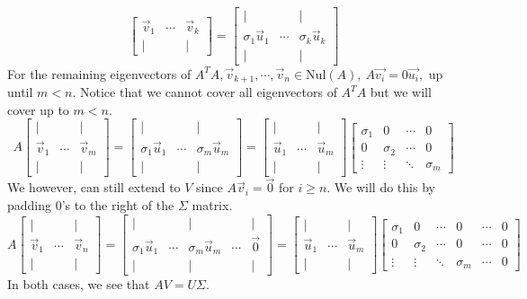 \begin{enumerate}[resume]
{$$\begin{bmatrix}
    \vec{v}_{1} & \cdots & \vec{v}_{k}  \\ | & \ & | \end{bmatrix}
    =  \begin{bmatrix} | & \ & | \\ \sigma_{1} \vec{u}_{1} & \cdots & \sigma_{k} \vec{u}_{k} \\ | & \ & | \end{bmatrix}$$
    For the remaining eigenvectors of $A^{T}A, \vec{v}_{k + 1}, \cdots, \vec{v}_{n} \in \text{Nul}(A), \ A \vec{v_{i}} = 0 \vec{u_{i}},$ up until $m < n.$ Notice that we cannot cover all eigenvectors of $A^{T} A$ but we will cover up to $m < n.$
    $$A \begin{bmatrix} | & \ & | \\
    \vec{v}_{1} & \cdots & \vec{v}_{m}  \\ | & \ & | \end{bmatrix} =
    \begin{bmatrix} | & \ & | \\ \sigma_{1} \vec{u}_{1} & \cdots & \sigma_{m} \vec{u}_{m} \\ | & \ & | \end{bmatrix} =
     \begin{bmatrix} | & \ & | \\ \vec{u}_{1} & \cdots & \vec{u}_{m} \\ | & \ & | \end{bmatrix} \begin{bmatrix} \sigma_{1} & 0 &  \cdots & 0 \\ 0 & \sigma_{2} & \cdots & 0 \\ \vdots & \vdots & \ddots & \sigma_{m} \end{bmatrix}$$
    We however, can still extend to $V$ since $A \vec{v}_{i} = \vec{0}$ for $i \geq n.$ We will do this by padding $0$'s to the right of the $\Sigma$ matrix.
    $$A \begin{bmatrix} | & \ & | \\
    \vec{v}_{1} & \cdots & \vec{v}_{n}  \\ | & \ & | \end{bmatrix} =
    \begin{bmatrix} | & \ & | &  & | \\ \sigma_{1} \vec{u}_{1} & \cdots & \sigma_{m} \vec{u}_{m} & \cdots & \vec{0} \\ | & \ & | &  & | \end{bmatrix} =
     \begin{bmatrix} | & \ & | \\ \vec{u}_{1} & \cdots & \vec{u}_{m} \\ | & \ & | \end{bmatrix} \begin{bmatrix} \sigma_{1} & 0 & \cdots & 0 & \cdots & 0 \\ 0 & \sigma_{2} & \cdots & 0 & \cdots & 0 \\ \vdots & \vdots & \ddots & \sigma_{m} & \cdots&  0 \end{bmatrix}$$
    In both cases, we see that $AV = U\Sigma .$
  }


\end{enumerate}
